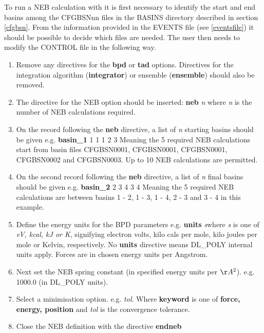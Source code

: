 To run a NEB calculation with \D{} it is first necessary to identify the
start and end basins among the CFGBSNnn files in the BASINS directory
described in section \ref{cfgbsn}. From the information provided in
the EVENTS file (see \ref{eventsfile}) it should be possible to decide which
files are needed. The user then needs to modify the CONTROL file in
the following way.
\begin{enumerate}
\item Remove any directives for the {\bf bpd} or {\bf tad}
options. Directives for the integration algorithm ({\bf integrator}) or
ensemble ({\bf ensemble}) should also be removed.
\item The directive for the NEB option should be inserted: \newline
{\bf neb} {\em n} \newline
where {\em n} is the number of NEB calculations required.
\item On the record following the {\bf neb} directive, a list of 
{\em n} starting basins  should be given e.g.\newline
{\bf basin\_1} 1 1 1 2 3 \newline
Meaning the 5 required NEB calculations start from basin files
CFGBSN0001, CFGBSN0001, CFGBSN0001, CFGBSN0002 and CFGBSN0003. Up to
10 NEB calculations are permitted.
\item On the second record following the {\bf neb} directive, a list of 
{\em n} final basins should be given e.g.\newline
{\bf basin\_2} 2 3 4 3 4 \newline
Meaning the 5 required NEB calculations are between basins 1 - 2, 1
- 3, 1 - 4, 2 - 3 and 3 - 4 in this example.
\item Define the energy units for the BPD parameters e.g. \newline
{\bf units} {\em s}\newline where {\em s} is one of {\em eV,
kcal, kJ or K}, signifying electron volts, kilo cals per mole,
kilo joules per mole or Kelvin, respectively. No {\bf units}
directive means DL\_POLY internal units apply. Forces are in
chosen energy units per Angstrom.
\item Next set the NEB spring constant (in specified energy units per $\AA^2$). 
e.g.  1000.0 (in DL\_POLY units).
\item Select a minimisation option.  e.g. 
 {\em tol}.\newline 
Where {\bf keyword} is one of {\bf force, energy, position} and {\em
tol} is the convergence tolerance.
\item Close the NEB definition with the directive \newline
{\bf endneb}
\end{enumerate}

